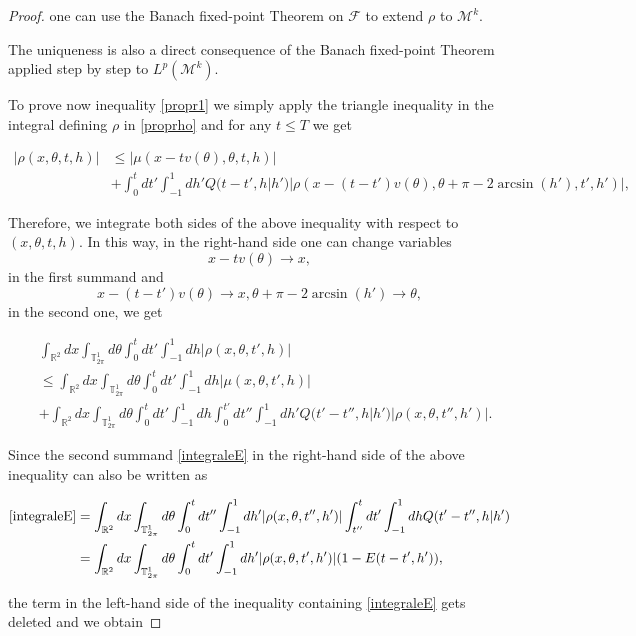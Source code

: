 \documentclass[a4paper,10pt,reqno]{amsart}
\numberwithin{equation}{subsection}
\numberwithin{figure}{subsection}
\begin{document}
\begin{proof}
one can use the Banach fixed-point Theorem on $\mathcal{F}$ to extend $\rho$ to ${\mathcal M}^k$.

The uniqueness is also a direct consequence of the Banach fixed-point Theorem applied step by step to $L^p({\mathcal M}^k)$.

To prove now inequality \eqref{propr1} we simply apply the triangle inequality in the integral defining $\rho$ in \eqref{proprho} and for any $t\leq T$ we get

{\small\begin{align*}
|\rho(x,\theta,t,h)|&\leq|\mu(x-tv(\theta),\theta,t,h)|
\\
&+\int_0^tdt'\int_{-1}^1dh' Q(t-t',h|h')|\rho(x-(t-t')v(\theta),\theta+\pi-2\arcsin(h'),t',h')|,
\end{align*}}

Therefore, we integrate both sides of the above inequality with respect to $(x,\theta,t,h)$. In this way, in the right-hand side one can change variables
\[
x-tv(\theta)\to x,
\]
in the first summand and
\[
x-(t-t')v(\theta)\to x,\theta+\pi-2\arcsin(h')\to\theta,
\]
in the second one, we get

\begin{align}
\nonumber&\int_{\mathbb{R}^2}dx\int_{\mathbb{T}^1_{2\pi}}d\theta\int_0^tdt'\int_{-1}^1dh|\rho(x,\theta,t',h)|
\\
\nonumber&\leq\int_{\mathbb{R}^2}dx\int_{\mathbb{T}^1_{2\pi}}d\theta\int_0^tdt'\int_{-1}^1dh\left|\mu(x,\theta,t',h)\right|
\\
\label{integraleE}&+\int_{\mathbb{R}^2}dx\int_{\mathbb{T}^1_{2\pi}}d\theta\int_0^tdt'\int_{-1}^1dh\int_0^{t'}dt''\int_{-1}^1dh' Q(t'-t'',h|h')|\rho(x,\theta,t'',h')|.
\end{align}

Since the second summand \eqref{integraleE} in the right-hand side of the above inequality can also be written as

\begin{align*}
\eqref{integraleE}&=\int_{\mathbb{R}^2}dx\int_{\mathbb{T}^1_{2\pi}}d\theta\int_0^tdt''\int_{-1}^1dh'|\rho(x,\theta,t'',h')|\int_{t''}^tdt'\int_{-1}^1dhQ(t'-t'',h|h')
\\
&=\int_{\mathbb{R}^2}dx\int_{\mathbb{T}^1_{2\pi}}d\theta\int_0^tdt'\int_{-1}^1dh'|\rho(x,\theta,t',h')|(1-E(t-t',h')),
\end{align*}

the term in the left-hand side of the inequality containing \eqref{integraleE} gets deleted and we obtain


\end{proof}
\end{document}
